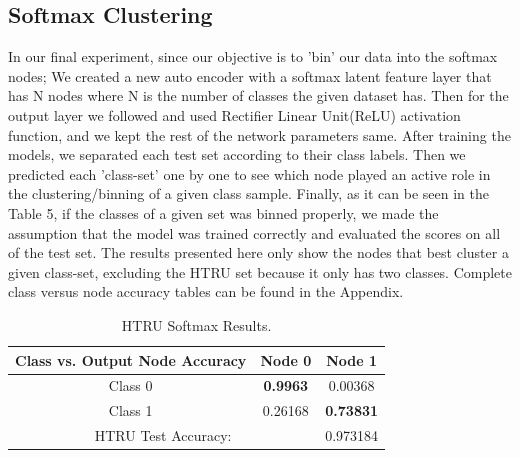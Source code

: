 \documentclass[journal]{IEEEtran}
\begin{document}
    \subsection{Softmax Clustering}
    In our final experiment, since our objective is to 'bin' our data into the softmax nodes; We created a new auto encoder with a softmax latent feature layer that has N nodes where N is the number of classes the given dataset has. Then for the output layer we followed \cite{xie2016unsupervised} and used Rectifier Linear Unit(ReLU) activation function, and we kept the rest of the network parameters same. After training the models, we separated each test set according to their class labels. Then we predicted each 'class-set' one by one to see which node played an active role in the clustering/binning of a given class sample. Finally, as it can be seen in the Table 5, if the classes of a given set was binned properly, we made the assumption that the model was trained correctly and evaluated the scores on all of the test set. The results presented here only show the nodes that best cluster a given class-set, excluding the HTRU set because it only has two classes. Complete class versus node accuracy tables can be found in the Appendix. 

\begin{table}[!ht]
  \renewcommand{\arraystretch}{1.3}
  \caption{HTRU Softmax Results.}
  \label{tab_htru_sfx}
  \centering
  \begin{tabular}{|c|c|c|}
  \hline
  Class vs. Output Node Accuracy& Node 0 & Node 1  \\
  \hline
  \hline
  Class 0   &  \textbf{0.9963}    & 0.00368 \\
  \hline
  Class 1   &  0.26168  &  \textbf{0.73831} \\
  \hline
  \multicolumn{2}{|c|}{HTRU Test Accuracy:  } & 0.973184\\
  \hline  

\end{tabular}
  \end{table}
\end{document}
